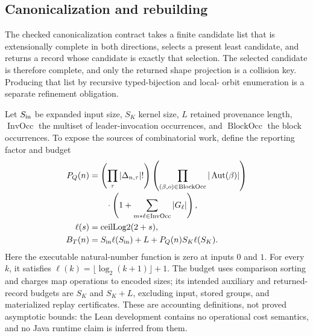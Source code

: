 \subsection{Canonicalization and rebuilding}
\label{sec:algorithm}

The checked canonicalization contract takes a finite candidate list that is
extensionally complete in both directions, selects a present least candidate,
and returns a record whose candidate is exactly that selection.  The selected
candidate is therefore complete, and only the returned shape projection is a
collision key.  Producing that list by recursive typed-bijection and local-
orbit enumeration is a separate refinement obligation.

Let $S_{\rm in}$ be expanded input size, $S_K$ kernel size, $L$ retained
provenance length, $\operatorname{InvOcc}$ the multiset of leader-invocation
occurrences, and $\operatorname{BlockOcc}$ the block occurrences.  To expose
the sources of combinatorial work, define the reporting factor and budget
\begin{align*}
P_Q(n)&=\left(\prod_\tau|\Delta_{n,\tau}|!\right)
\left(\prod_{(\beta,o)\in\operatorname{BlockOcc}}|\operatorname{Aut}(\beta)|\right)\\[-2pt]
&\qquad\cdot\left(1+\sum_{m*\ell\in\operatorname{InvOcc}}|G_\ell|\right),\\
\leanref{TSG-ACC-001}{TypedSlottedEGraphsPaper.ClaimLedger.ceilLog2}
\ell(s)&=\operatorname{ceilLog2}(2+s),\\
B_T(n)&=S_{\rm in}\ell(S_{\rm in})+L+
P_Q(n)S_K\ell(S_K).
\end{align*}
Here the executable natural-number function is zero at inputs $0$ and $1$.
For every $k$, it satisfies
$\ell(k)=\lfloor\log_2(k+1)\rfloor+1$.
The budget uses comparison sorting and charges map operations to encoded
sizes; its intended auxiliary and returned-record budgets are $S_K$ and
$S_K+L$, excluding input, stored groups, and materialized replay certificates.
These are accounting definitions, not proved asymptotic bounds: the Lean
development contains no operational cost semantics, and no Java runtime claim
is inferred from them.

